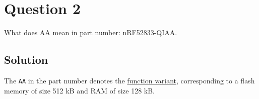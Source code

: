 \section*{Question 2}

What does AA mean in part number: nRF52833-QIAA.\@

\subsection*{Solution}

The \texttt{AA} in the part number denotes the \underline{function variant}, corresponding to a flash memory of size 512 kB and RAM of size 128 kB.
